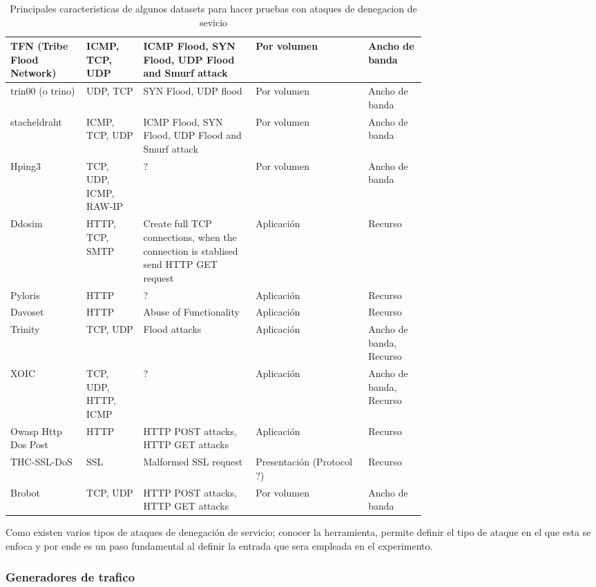 \documentclass[12pt]{article}
\begin{document}
\begin{landscape}
\begin{table}[htbp]
\begin{tabular}{|p{0.1\linewidth}|p{0.1\linewidth}|p{0.2\linewidth}|p{0.2\linewidth}|p{0.1\linewidth}|}
TFN (Tribe Flood Network) &
ICMP, TCP, UDP & 
ICMP Flood, SYN Flood, UDP Flood and Smurf attack & 
Por volumen & 
Ancho de banda
\tabularnewline \hline

trin00 (o trino) &
UDP, TCP & 
SYN Flood, UDP flood & 
Por volumen & 
Ancho de banda
\tabularnewline \hline

stacheldraht &
ICMP, TCP, UDP & 
ICMP Flood, SYN Flood, UDP Flood and Smurf attack & 
Por volumen & 
Ancho de banda
\tabularnewline \hline

Hping3 &
TCP, UDP, ICMP, RAW-IP & 
? & 
Por volumen & 
Ancho de banda
\tabularnewline \hline

Ddosim &
HTTP, TCP, SMTP & 
Create full TCP connections, when the connection is stablised send HTTP GET request & 
Aplicación & 
Recurso
\tabularnewline \hline

Pyloris &
HTTP & 
? & 
Aplicación & 
Recurso
\tabularnewline \hline

Davoset &
HTTP & 
Abuse of Functionality & 
Aplicación & 
Recurso
\tabularnewline \hline

Trinity &
TCP, UDP & 
Flood attacks & 
Aplicación & 
Ancho de banda, Recurso
\tabularnewline \hline

XOIC &
TCP, UDP, HTTP,  ICMP & 
? & 
Aplicación & 
Ancho de banda, Recurso
\tabularnewline \hline

Owasp Http Dos Post &
HTTP & 
HTTP POST attacks, HTTP GET attacks & 
Aplicación & 
Recurso
\tabularnewline \hline

THC-SSL-DoS &
SSL & 
Malformed SSL request & 
Presentación (Protocol ?) & 
Recurso
\tabularnewline \hline

Brobot &
TCP, UDP & 
HTTP POST attacks, HTTP GET attacks &  
Por volumen & 
Ancho de banda
\tabularnewline \hline

\end{tabular}
\caption{Principales caracteristicas de algunos datasets para hacer pruebas con ataques de denegacion de sevicio} \label{tab:sometab}
\end{table} 


\end{landscape}
\newpage


Como existen varios tipos de ataques de denegación de servicio; conocer la herramienta, permite definir el tipo de ataque en el que esta se enfoca y por ende es un paso fundamental al definir la entrada que sera empleada en el experimento.

\subsubsection{Generadores de trafico}
\end{document}
